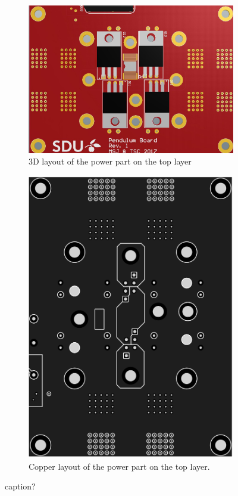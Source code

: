 \begin{figure}
	\centering
	\begin{subfigure}[b]{0.49\textwidth}
		\centering
		\includegraphics[angle=90,width=\linewidth]{graphics/power_layout_3}
		\caption{3D layout of the power part on the top layer}
		\label{sfig:power_layout_3}
	\end{subfigure}
	\begin{subfigure}[b]{0.49\textwidth} 
		\centering
		\includegraphics[width=\linewidth]{graphics/power_layout}
		\caption{Copper layout of the power part on the top layer.}
		\label{sfig:power_layout_2}
	\end{subfigure}
	\caption{caption?}
	\label{fig:power_layout}
\end{figure}
